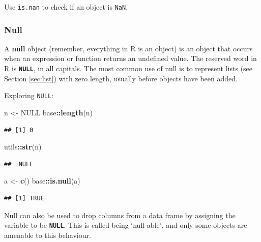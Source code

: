 \documentclass[
]{book}
\newenvironment{Shaded}{\begin{snugshade}}{\end{snugshade}}
\newcommand{\ConstantTok}[1]{\textcolor[rgb]{0.56,0.35,0.01}{#1}}
\newcommand{\FunctionTok}[1]{\textcolor[rgb]{0.13,0.29,0.53}{\textbf{#1}}}
\newcommand{\NormalTok}[1]{#1}
\newcommand{\OtherTok}[1]{\textcolor[rgb]{0.56,0.35,0.01}{#1}}
\newcommand{\SpecialCharTok}[1]{\textcolor[rgb]{0.81,0.36,0.00}{\textbf{#1}}}
\begin{document}
Use \texttt{is.nan} to check if an object is \texttt{NaN}.

\subsubsection{Null}\label{sec:null}

A \textbf{null} object (remember, everything in R is an object) is an object that occurs when an expression or function returns an undefined value. The reserved word in R is \textbf{\texttt{NULL}}, in all capitals. The most common use of null is to represent lists (see Section \ref{sec:list}) with zero length, usually before objects have been added.

Exploring \texttt{NULL}:

\begin{Shaded}
\begin{Highlighting}[]
\NormalTok{n }\OtherTok{\textless{}{-}} \ConstantTok{NULL} 
\NormalTok{base}\SpecialCharTok{::}\FunctionTok{length}\NormalTok{(n)}
\end{Highlighting}
\end{Shaded}

\begin{verbatim}
## [1] 0
\end{verbatim}

\begin{Shaded}
\begin{Highlighting}[]
\NormalTok{utils}\SpecialCharTok{::}\FunctionTok{str}\NormalTok{(n)}
\end{Highlighting}
\end{Shaded}

\begin{verbatim}
##  NULL
\end{verbatim}

\begin{Shaded}
\begin{Highlighting}[]
\NormalTok{a }\OtherTok{\textless{}{-}} \FunctionTok{c}\NormalTok{()}
\NormalTok{base}\SpecialCharTok{::}\FunctionTok{is.null}\NormalTok{(a)}
\end{Highlighting}
\end{Shaded}

\begin{verbatim}
## [1] TRUE
\end{verbatim}

Null can also be used to drop columns from a data frame by assigning the variable to be \textbf{\texttt{NULL}}. This is called being `null-able', and only some objects are amenable to this behaviour.
\end{document}

